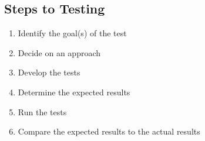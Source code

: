 \subsection[Steps to Testing]{Steps to Testing
    \citep[p.~443]{PetersAndPedrycz2000}}
\begin{enumerate}
    \item Identify the goal(s) of the test
    \item Decide on an approach
    \item Develop the tests
    \item Determine the expected results
    \item Run the tests
    \item Compare the expected results to the actual results
\end{enumerate}

